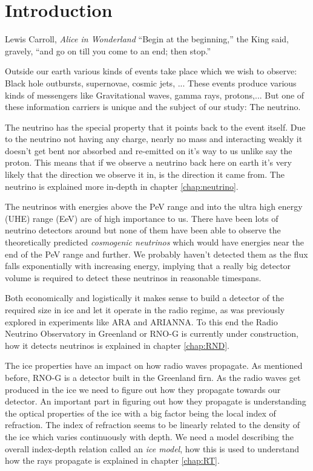 \chapter*{Introduction}
\begin{chapquote}{Lewis Carroll, \textit{Alice in Wonderland}}
``Begin at the beginning,'' the King said, gravely, ``and go on till you
come to an end; then stop.''
\end{chapquote}
Outside our earth various kinds of events take place which we wish to 
observe: Black hole outbursts, supernovae, cosmic jets, ...
These events produce various kinds of messengers like 
Gravitational waves, gamma rays, protons,...
But one of these information carriers is unique and
the subject of our study: The neutrino. 

The neutrino has the special property that it points back to the event itself.
Due to the neutrino not having any charge, nearly no mass and 
interacting weakly it doesn't get bent nor absorbed and re-emitted 
on it's way to us unlike say the proton. This means that if we observe
a neutrino back here on earth it's very likely that the direction we observe
it in, is the direction it came from. The neutrino is explained more in-depth in chapter
\ref{chap:neutrino}.

The neutrinos with energies above the PeV range and into the ultra high energy
(UHE) range (EeV) are of high importance to us.  There have been lots of neutrino
detectors around but none of them have been able to observe the theoretically
predicted \textit{cosmogenic neutrinos} which would have energies near the end
of the PeV range and further.  We probably haven't detected them as the flux
falls exponentially with increasing energy, implying that a really big detector
volume is required to detect these neutrinos in reasonable timespans. 

Both economically and logistically it makes sense to build a detector of the
required size in ice and let it operate in the radio regime, as was previously
explored in experiments like ARA and ARIANNA.  To this end the Radio Neutrino
Observatory in Greenland or RNO-G is currently under construction, how it 
detects neutrinos is explained in chapter \ref{chap:RND}.

The ice properties have an impact on how radio waves propagate. As mentioned
before, RNO-G is a detector built in the Greenland firn. As the radio waves get
produced in the ice we need to figure out how they propagate towards our
detector. An important part in figuring out how they propagate is understanding
the optical properties of the ice with a big factor being the local index of
refraction. The index of refraction seems to be linearly related to the density of the ice which
varies continuously with depth. We need a model describing the overall index-depth relation
called an \textit{ice model}, how this is used to understand how the rays propagate
is explained in chapter \ref{chap:RT}.

